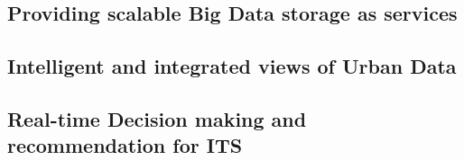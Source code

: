 \subsection{Providing scalable Big Data storage as services}

\subsection{Intelligent and integrated views of Urban Data}

\subsection{Real-time Decision making and recommendation for ITS}

